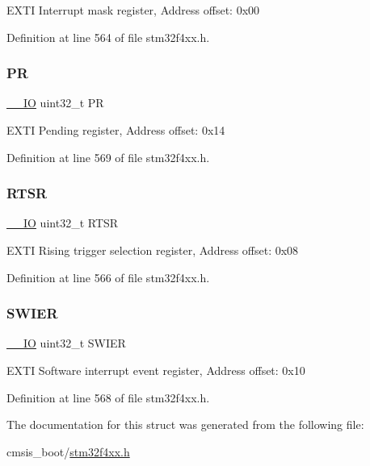 E\+X\+TI Interrupt mask register, Address offset\+: 0x00 

Definition at line 564 of file stm32f4xx.\+h.

\mbox{\label{struct_e_x_t_i___type_def_af8d25514079514d38c104402f46470af}} 
\subsubsection{\texorpdfstring{PR}{PR}}
{\footnotesize\ttfamily \hyperlink{group___c_m_s_i_s__core__definitions_gaec43007d9998a0a0e01faede4133d6be}{\+\_\+\+\_\+\+IO} uint32\+\_\+t PR}

E\+X\+TI Pending register, Address offset\+: 0x14 

Definition at line 569 of file stm32f4xx.\+h.

\mbox{\label{struct_e_x_t_i___type_def_a0d952a17455687d6e9053730d028fa1d}} 
\subsubsection{\texorpdfstring{R\+T\+SR}{RTSR}}
{\footnotesize\ttfamily \hyperlink{group___c_m_s_i_s__core__definitions_gaec43007d9998a0a0e01faede4133d6be}{\+\_\+\+\_\+\+IO} uint32\+\_\+t R\+T\+SR}

E\+X\+TI Rising trigger selection register, Address offset\+: 0x08 

Definition at line 566 of file stm32f4xx.\+h.

\mbox{\label{struct_e_x_t_i___type_def_a9eae93b6cc13d4d25e12f2224e2369c9}} 
\subsubsection{\texorpdfstring{S\+W\+I\+ER}{SWIER}}
{\footnotesize\ttfamily \hyperlink{group___c_m_s_i_s__core__definitions_gaec43007d9998a0a0e01faede4133d6be}{\+\_\+\+\_\+\+IO} uint32\+\_\+t S\+W\+I\+ER}

E\+X\+TI Software interrupt event register, Address offset\+: 0x10 

Definition at line 568 of file stm32f4xx.\+h.



The documentation for this struct was generated from the following file\+:\begin{DoxyCompactItemize}
\item 
cmsis\+\_\+boot/\hyperlink{stm32f4xx_8h}{stm32f4xx.\+h}\end{DoxyCompactItemize}
